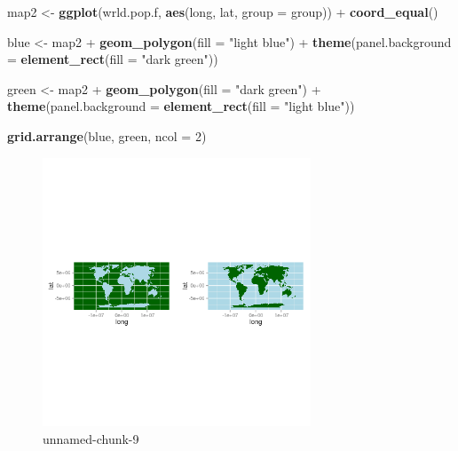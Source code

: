 \documentclass[]{article}
\newenvironment{Shaded}{}{}
\newcommand{\KeywordTok}[1]{\textcolor[rgb]{0.00,0.44,0.13}{\textbf{{#1}}}}
\newcommand{\DataTypeTok}[1]{\textcolor[rgb]{0.56,0.13,0.00}{{#1}}}
\newcommand{\DecValTok}[1]{\textcolor[rgb]{0.25,0.63,0.44}{{#1}}}
\newcommand{\StringTok}[1]{\textcolor[rgb]{0.25,0.44,0.63}{{#1}}}
\newcommand{\NormalTok}[1]{{#1}}
\let\Oldincludegraphics\includegraphics
\renewcommand{\includegraphics}[1]{\Oldincludegraphics[width=8cm]{#1}}
\begin{document}
\begin{Shaded}
\begin{Highlighting}[]
\NormalTok{map2 <- }\KeywordTok{ggplot}\NormalTok{(wrld.pop.f, }\KeywordTok{aes}\NormalTok{(long, lat, }\DataTypeTok{group =} \NormalTok{group)) + }\KeywordTok{coord_equal}\NormalTok{()}

\NormalTok{blue <- map2 + }\KeywordTok{geom_polygon}\NormalTok{(}\DataTypeTok{fill =} \StringTok{"light blue"}\NormalTok{) + }\KeywordTok{theme}\NormalTok{(}\DataTypeTok{panel.background =} \KeywordTok{element_rect}\NormalTok{(}\DataTypeTok{fill =} \StringTok{"dark green"}\NormalTok{))}

\NormalTok{green <- map2 + }\KeywordTok{geom_polygon}\NormalTok{(}\DataTypeTok{fill =} \StringTok{"dark green"}\NormalTok{) + }\KeywordTok{theme}\NormalTok{(}\DataTypeTok{panel.background =} \KeywordTok{element_rect}\NormalTok{(}\DataTypeTok{fill =} \StringTok{"light blue"}\NormalTok{))}

\KeywordTok{grid.arrange}\NormalTok{(blue, green, }\DataTypeTok{ncol =} \DecValTok{2}\NormalTok{)}
\end{Highlighting}
\end{Shaded}
\begin{figure}[htbp]
\centering
\includegraphics{figure/unnamed-chunk-9.png}
\caption{unnamed-chunk-9}
\end{figure}
\end{document}
